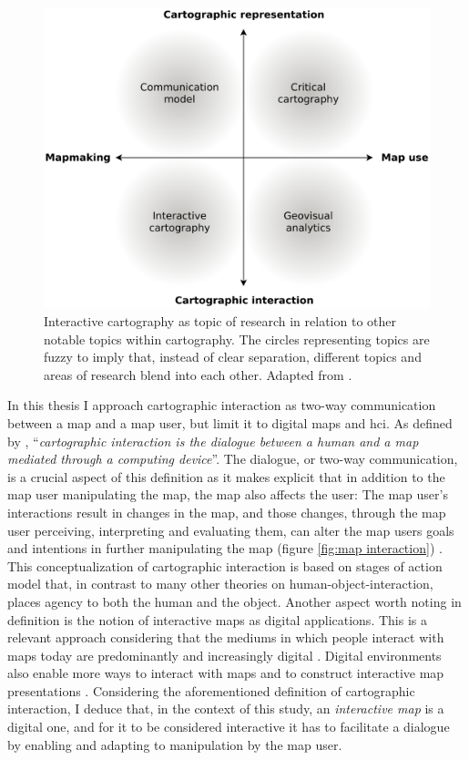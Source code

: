 \begin{figure}[H]
	\centering
	\includegraphics[width=\diagramwidth]{visual/figures/diagrams/cartography_topics.png}
	\caption{
		Interactive cartography as topic of research
		in relation to other notable topics within cartography.
		The circles representing topics are fuzzy to imply that,
		instead of clear separation,
		different topics and areas of research blend into each other.
		Adapted from \textcite{rot2013b}.
	}
	\label{fig:cartography topics}
\end{figure}


In this thesis I approach cartographic interaction as
two-way communication between a map and a map user,
but limit it to digital maps and \acrshort{hci}.
As defined by \textcite[p.~14]{rot2011},
\enquote{\textit{cartographic interaction is the dialogue between a human and a map
mediated through a computing device}}.
The dialogue, or two-way communication, is a crucial aspect of this definition
as it makes explicit that in addition to the map user manipulating the map,
the map also affects the user:
The map user's interactions result in changes in the map,
and those changes, through the map user perceiving, interpreting and evaluating them,
can alter the map users goals and intentions
in further manipulating the map (figure \ref{fig:map interaction}) \parencite{rot2012}.
This conceptualization of cartographic interaction
is based on 
stages of action model that,
in contrast to many other theories on human-object-interaction,
places agency to both the human and the object.
Another aspect worth noting in  definition
is the notion of interactive maps as digital applications.
This is a relevant approach considering
that the mediums in which people interact with maps today
are predominantly and increasingly digital \parencite{mei2019}.
Digital environments also enable more ways to interact with maps
and to construct interactive map presentations \parencite{rot2013b, mei2019}.
Considering the aforementioned definition of cartographic interaction,
I deduce that, in the context of this study,
an \textit{interactive map} is a digital one,
and for it to be considered interactive it has to
facilitate a dialogue by enabling and adapting to manipulation by the map user.


